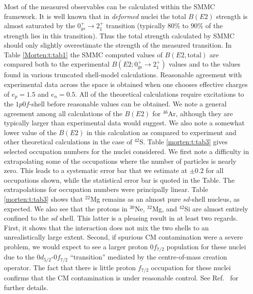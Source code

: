 Most of the measured observables can be calculated within the SMMC
framework.  It is well known that in {\it deformed} nuclei the total
$B(E2)$ strength is almost saturated by the $0^+_{gs} \rightarrow
2_1^+$ transition (typically 80\% to 90\% of the strength lies in this
transition).  Thus the total strength calculated by SMMC should only
slightly overestimate the strength of the measured transition.  In
Table \ref{Morten:t:tab1} the SMMC computed values of $B(E2,
\mathrm{total})$ are compared both to the experimental $B(E2;
0^+_{\mathrm{gs}} \rightarrow 2^+_1)$ values and to the values found
in various truncated shell-model calculations.  Reasonable agreement
with experimental data across the space is obtained when one chooses
effective charges of $e_p=1.5$ and $e_n=0.5$.  All of the theoretical
calculations require excitations to the $1p0f$-shell before reasonable
values can be obtained.  We note a general agreement among all
calculations of the $B(E2)$ for $^{46}$Ar, although they are typically
larger than experimental data would suggest. We also note a somewhat
lower value of the $B(E2)$ in this calculation as compared to
experiment and other theoretical calculations in the case of $^{42}$S.
Table \ref{morten:t:tab3} gives selected occupation numbers for the
nuclei considered.  We first note a difficulty in extrapolating some
of the occupations where the number of particles is nearly zero.  This
leads to a systematic error bar that we estimate at $\pm 0.2$ for all
occupations shown, while the statistical error bar is quoted in the
Table. The extrapolations for occupation numbers were principally
linear. Table \ref{morten:t:tab3} 
shows that $^{22}$Mg remains as an almost pure
$sd$-shell nucleus, as expected.  We also see that the protons in
$^{30}$Ne, $^{32}$Mg, and $^{42}$Si are almost entirely confined to
the $sd$ shell.  This latter is a pleasing result in at least two
regards.  First, it shows that the interaction does not mix the two
shells to an unrealistically large extent.  Second, if spurious CM
contamination were a severe problem, we would expect to see a larger
proton $0f_{7/2}$ population for these nuclei due to the
$0d_{5/2}$-$0f_{7/2}$ ``transition'' mediated by the centre-of-mass
creation operator.  The fact that there is little proton $f_{7/2}$
occupation for these nuclei confirms that the CM contamination is
under reasonable control.  See Ref.~ for
further details.

